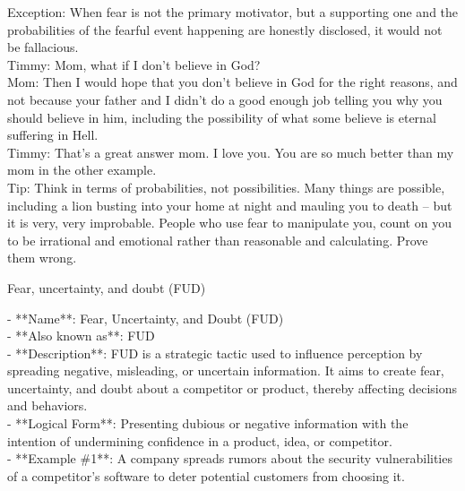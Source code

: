 \documentclass[a4paper,12pt,single,pdftex]{scrbook}
\begin{document}
{    
      Exception: When fear is not the primary motivator, but a supporting one and the probabilities of the fearful event happening are honestly disclosed, it would not be fallacious.
    \\

    
      Timmy: Mom, what if I don’t believe in God?
    \\

    
      Mom: Then I would hope that you don’t believe in God for the right reasons, and not because your father and I didn’t do a good enough job telling you why you should believe in him, including the possibility of what some believe is eternal suffering in Hell.
    \\

    
      Timmy: That’s a great answer mom.  I love you.  You are so much better than my mom in the other example.
    \\

    
      Tip: Think in terms of probabilities, not possibilities.  Many things are possible, including a lion busting into your home at night and mauling you to death -- but it is very, very improbable.  People who use fear to manipulate you, count on you to be irrational and emotional rather than reasonable and calculating.  Prove them wrong.
    \\

  }


 Fear, uncertainty, and doubt (FUD)
    
      - **Name**: Fear, Uncertainty, and Doubt (FUD)
    \\

    
      - **Also known as**: FUD
    \\

    
      - **Description**: FUD is a strategic tactic used to influence perception by spreading negative, misleading, or uncertain information. It aims to create fear, uncertainty, and doubt about a competitor or product, thereby affecting decisions and behaviors.
    \\

    
      - **Logical Form**: Presenting dubious or negative information with the intention of undermining confidence in a product, idea, or competitor.
    \\

    
      - **Example \#1**: A company spreads rumors about the security vulnerabilities of a competitor's software to deter potential customers from choosing it.
    \\
\end{document}
